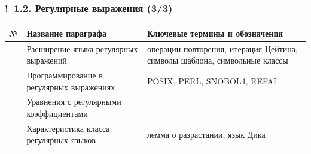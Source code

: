 \documentclass[mathserif,12pt,aspectratio=169]{beamer}
\def\DMref#1#2{{\color{blue}\underline{\hyperlink{#2}{#1}}}}
\def\Ok{{\color{green}\textbf{!}\ }}
\begin{document}
\begin{frame}
\frametitle{\Ok 1.2. Регулярные выражения (3/3)}

\begin{tabular}{p{10mm}|p{45mm}|p{90mm}}
  № & Название параграфа
  & Ключевые термины и обозначения \\
  \hline
\text{\DMref{1.2.5.}{1.2.5.}} & Расширение языка регулярных выражений &
{операции повторения, итерация Цейтина, символы шаблона, символьные классы}\\   
\text{\DMref{1.2.6.}{1.2.6.}} & Программирование в регулярных выражениях &
{POSIX, PERL, SNOBOL4, REFAL }\\   
\text{\DMref{1.2.7.}{1.2.7.}} & Уравнения с регулярными коэффициентами &
{ }\\   
\text{\DMref{1.2.8.}{1.2.8.}} & Характеристика класса регулярных языков &
{лемма о разрастании, язык Дика  }   
\end{tabular}

\end{frame}
\end{document}
